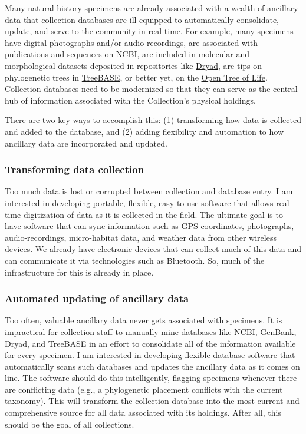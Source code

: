 \documentclass[10pt]{article}
\begin{document}
Many natural history specimens are already associated with a wealth of ancillary
data that collection databases are ill-equipped to automatically consolidate,
update, and serve to the community in real-time.
For example, many specimens 
have digital photographs and/or audio recordings,
are associated with publications and sequences on
\href{http://www.ncbi.nlm.nih.gov}{NCBI}, are included in molecular and
morphological datasets deposited in repositories like
\href{http://datadryad.org}{Dryad}, are tips on phylogenetic trees in
\href{http://treebase.org}{TreeBASE}, or better yet, on the
\href{http://opentreeoflife.org}{Open Tree of Life}.
Collection databases need to be modernized so that they can serve
as the central hub of information associated with the Collection's
physical holdings.

There are two key ways to accomplish this: (1) transforming how data is 
collected and added to the database, and (2) adding flexibility and
automation to how ancillary data are incorporated and updated.

\subsubsection*{Transforming data collection}
Too much data is lost or corrupted between collection and database entry.
I am interested in developing portable, flexible, easy-to-use software
that allows real-time digitization of data as it is collected in the field.
The ultimate goal is to have software that can sync information such as
GPS coordinates, photographs, audio-recordings, micro-habitat data, and
weather data from other wireless devices.
We already have electronic devices that can collect much of this data and can
communicate it via technologies such as Bluetooth.
So, much of the infrastructure for this is already in place.

\subsubsection*{Automated updating of ancillary data}
Too often, valuable ancillary data never gets associated with specimens.
It is impractical for collection staff to manually mine databases like NCBI,
GenBank, Dryad, and TreeBASE in an effort to consolidate all of the information
available for every specimen.
I am interested in developing flexible database software that automatically
scans such databases and updates the ancillary data as it comes on line.
The software should do this intelligently, flagging specimens whenever there
are conflicting data (e.g., a phylogenetic placement conflicts with the current
taxonomy).
This will transform the collection database into the most current and
comprehensive source for all data associated with its holdings.
After all, this should be the goal of all collections.
\end{document}
